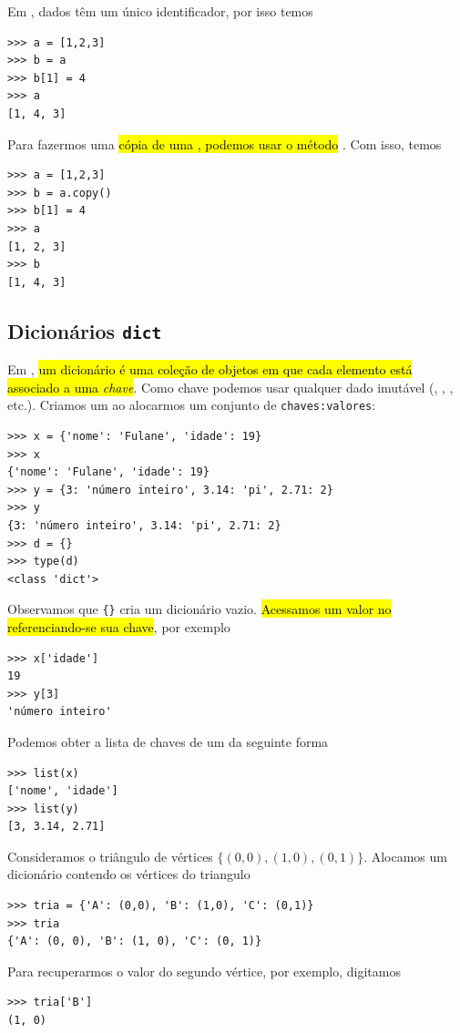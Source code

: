 \begin{obs}
  Em {\python}, dados têm um único identificador, por isso temos

\begin{lstlisting}
>>> a = [1,2,3]
>>> b = a
>>> b[1] = 4
>>> a
[1, 4, 3]
\end{lstlisting}

Para fazermos uma \hl{cópia de uma {\PYTHONlist}, podemos usar o método {\PYTHONlistDOTcopy}}. Com isso, temos

\begin{lstlisting}
>>> a = [1,2,3]
>>> b = a.copy()
>>> b[1] = 4
>>> a
[1, 2, 3]
>>> b
[1, 4, 3]
\end{lstlisting}

\end{obs}

\subsection{Dicionários \texttt{dict}}

Em {\python}, \hl{um dicionário {\PYTHONdict} é uma coleção de objetos em que cada elemento está associado a uma \emph{chave}}. Como chave podemos usar qualquer dado imutável (\PYTHONint, \PYTHONfloat, {\PYTHONstr}, etc.). Criamos um {\PYTHONdict} ao alocarmos um conjunto de \texttt{chaves:valores}:

\begin{lstlisting}
>>> x = {'nome': 'Fulane', 'idade': 19}
>>> x
{'nome': 'Fulane', 'idade': 19}
>>> y = {3: 'número inteiro', 3.14: 'pi', 2.71: 2}
>>> y
{3: 'número inteiro', 3.14: 'pi', 2.71: 2}
>>> d = {}
>>> type(d)
<class 'dict'>
\end{lstlisting}

Observamos que \lstinline+{}+ cria um dicionário vazio. \hl{Acessamos um valor no {\PYTHONdict} referenciando-se sua chave}, por exemplo

\begin{lstlisting}
>>> x['idade']
19
>>> y[3]
'número inteiro'
\end{lstlisting}
Podemos obter a lista de chaves de um {\PYTHONdict} da seguinte forma
\begin{lstlisting}
>>> list(x)
['nome', 'idade']
>>> list(y)
[3, 3.14, 2.71]
\end{lstlisting}

\begin{ex}\label{cap_lingua_sec_colecao:ex:tria0}
Consideramos o triângulo de vértices $\{(0,0), (1,0), (0,1)\}$. Alocamos um dicionário contendo os vértices do triangulo

\begin{lstlisting}
>>> tria = {'A': (0,0), 'B': (1,0), 'C': (0,1)}
>>> tria
{'A': (0, 0), 'B': (1, 0), 'C': (0, 1)}
\end{lstlisting}

Para recuperarmos o valor do segundo vértice, por exemplo, digitamos

\begin{lstlisting}
>>> tria['B']
(1, 0)
\end{lstlisting}

\end{ex}

